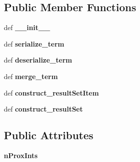 \subsection*{Public Member Functions}
\begin{DoxyCompactItemize}
\item 
\hypertarget{classcheshire3_1_1index_1_1_proximity_index_a2b804f778fa903b6e6bceb93f9d7e0dc}{def {\bfseries \-\_\-\-\_\-init\-\_\-\-\_\-}}\label{classcheshire3_1_1index_1_1_proximity_index_a2b804f778fa903b6e6bceb93f9d7e0dc}

\item 
\hypertarget{classcheshire3_1_1index_1_1_proximity_index_a7de7f9709431b665faf20c6b3863f12a}{def {\bfseries serialize\-\_\-term}}\label{classcheshire3_1_1index_1_1_proximity_index_a7de7f9709431b665faf20c6b3863f12a}

\item 
\hypertarget{classcheshire3_1_1index_1_1_proximity_index_a5e551f72a91c074d1eff381e7c6a3624}{def {\bfseries deserialize\-\_\-term}}\label{classcheshire3_1_1index_1_1_proximity_index_a5e551f72a91c074d1eff381e7c6a3624}

\item 
\hypertarget{classcheshire3_1_1index_1_1_proximity_index_aff63197e3a3524cbcc191b673de092d5}{def {\bfseries merge\-\_\-term}}\label{classcheshire3_1_1index_1_1_proximity_index_aff63197e3a3524cbcc191b673de092d5}

\item 
\hypertarget{classcheshire3_1_1index_1_1_proximity_index_a6bb32dc1bc1be114bbad2bbb9ae94a99}{def {\bfseries construct\-\_\-result\-Set\-Item}}\label{classcheshire3_1_1index_1_1_proximity_index_a6bb32dc1bc1be114bbad2bbb9ae94a99}

\item 
\hypertarget{classcheshire3_1_1index_1_1_proximity_index_a1e023d2e664eb3de4379dbbe79565ef6}{def {\bfseries construct\-\_\-result\-Set}}\label{classcheshire3_1_1index_1_1_proximity_index_a1e023d2e664eb3de4379dbbe79565ef6}

\end{DoxyCompactItemize}
\subsection*{Public Attributes}
\begin{DoxyCompactItemize}
\item 
\hypertarget{classcheshire3_1_1index_1_1_proximity_index_a0e31c6d7b0ea12aab7ba21f422c491d0}{{\bfseries n\-Prox\-Ints}}\label{classcheshire3_1_1index_1_1_proximity_index_a0e31c6d7b0ea12aab7ba21f422c491d0}

\end{DoxyCompactItemize}
